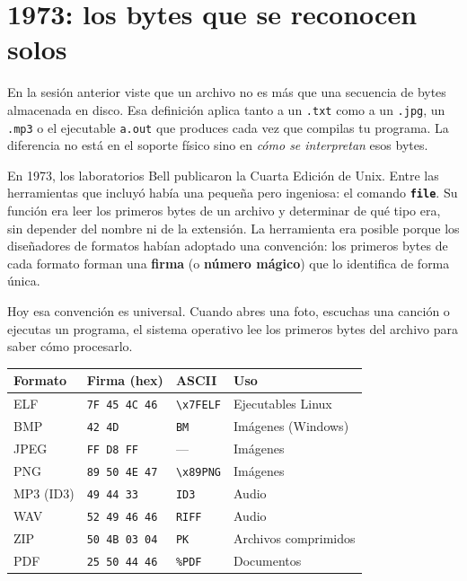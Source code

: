 \documentclass[12pt, oneside]{article}
\begin{document}

\tableofcontents
\newpage

\section{1973: los bytes que se reconocen solos}

En la sesión anterior viste que un archivo no es más que una secuencia de
bytes almacenada en disco.  Esa definición aplica tanto a un \texttt{.txt}
como a un \texttt{.jpg}, un \texttt{.mp3} o el ejecutable \texttt{a.out}
que produces cada vez que compilas tu programa.  La diferencia no está en
el soporte físico sino en \textit{cómo se interpretan} esos bytes.

En 1973, los laboratorios Bell publicaron la Cuarta Edición de Unix.  Entre
las herramientas que incluyó había una pequeña pero ingeniosa: el comando
\textbf{\texttt{file}}.  Su función era leer los primeros bytes de un
archivo y determinar de qué tipo era, sin depender del nombre ni de la
extensión.  La herramienta era posible porque los diseñadores de formatos
habían adoptado una convención: los primeros bytes de cada formato forman
una \textbf{firma} (o \textbf{número mágico}) que lo identifica de forma
única.

Hoy esa convención es universal.  Cuando abres una foto, escuchas una
canción o ejecutas un programa, el sistema operativo lee los primeros bytes
del archivo para saber cómo procesarlo.

\begin{center}
\begin{tabular}{llll}
  \toprule
  \textbf{Formato} & \textbf{Firma (hex)}            & \textbf{ASCII}          & \textbf{Uso} \\
  \midrule
  ELF              & \texttt{7F 45 4C 46}             & \texttt{\textbackslash x7FELF} & Ejecutables Linux \\
  BMP              & \texttt{42 4D}                   & \texttt{BM}             & Imágenes (Windows) \\
  JPEG             & \texttt{FF D8 FF}                & —                       & Imágenes \\
  PNG              & \texttt{89 50 4E 47}             & \texttt{\textbackslash x89PNG} & Imágenes \\
  MP3 (ID3)        & \texttt{49 44 33}                & \texttt{ID3}            & Audio \\
  WAV              & \texttt{52 49 46 46}             & \texttt{RIFF}           & Audio \\
  ZIP              & \texttt{50 4B 03 04}             & \texttt{PK}             & Archivos comprimidos \\
  PDF              & \texttt{25 50 44 46}             & \texttt{\%PDF}          & Documentos \\
  \bottomrule
\end{tabular}
\end{center}
\end{document}
